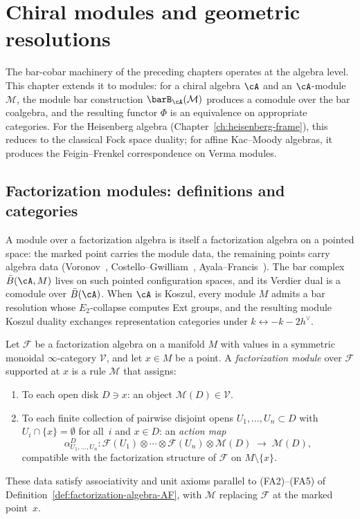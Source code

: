 \chapter{Chiral modules and geometric resolutions}
\label{chap:chiral-modules}


The bar-cobar machinery of the preceding chapters operates at the algebra level.  This chapter extends it to modules: for a chiral algebra $\cA$ and an $\cA$-module $\mathcal{M}$, the module bar construction $\barB_\cA(\mathcal{M})$ produces a comodule over the bar coalgebra, and the resulting functor $\Phi$ is an equivalence on appropriate categories.  For the Heisenberg algebra (Chapter~\ref{ch:heisenberg-frame}), this reduces to the classical Fock space duality; for affine Kac--Moody algebras, it produces the Feigin--Frenkel correspondence on Verma modules.

\section{Factorization modules: definitions and categories}

A module over a factorization algebra is itself a factorization algebra on a pointed space: the marked point carries the module data, the remaining points carry algebra data (Voronov~\cite{Voronov99}, Costello--Gwilliam~\cite{CG17}, Ayala--Francis~\cite{AF15}).  The bar complex $\bar{B}(\cA, M)$ lives on such pointed configuration spaces, and its Verdier dual is a comodule over $\bar{B}(\cA)$.  When $\cA$ is Koszul, every module $M$ admits a bar resolution whose $E_2$-collapse computes Ext groups, and the resulting module Koszul duality exchanges representation categories under $k \leftrightarrow -k - 2h^\vee$.

\begin{definition}\label{def:factorization-module}
Let $\mathcal{F}$ be a factorization algebra on a manifold $M$ with
values in a symmetric monoidal $\infty$-category $\mathcal{V}$, and let
$x \in M$ be a point.  A \emph{factorization module} over $\mathcal{F}$
supported at $x$ is a rule $\mathcal{M}$ that assigns:
\begin{enumerate}
\item To each open disk $D \ni x$: an object
   $\mathcal{M}(D) \in \mathcal{V}$.
\item To each finite collection of pairwise disjoint opens
   $U_1, \ldots, U_n \subset D$ with $U_i \cap \{x\} = \emptyset$
   for all~$i$ and $x \in D$: an \emph{action map}
   \[
   \alpha_{U_1,\ldots,U_n}^D:
   \mathcal{F}(U_1) \otimes \cdots \otimes \mathcal{F}(U_n)
   \otimes \mathcal{M}(D)
   \;\longrightarrow\; \mathcal{M}(D),
   \]
   compatible with the factorization structure of $\mathcal{F}$ on
   $M \setminus \{x\}$.
\end{enumerate}
These data satisfy associativity and unit axioms parallel to
(FA2)--(FA5) of Definition~\ref{def:factorization-algebra-AF},
with $\mathcal{M}$ replacing $\mathcal{F}$ at the marked point~$x$.
\end{definition}

